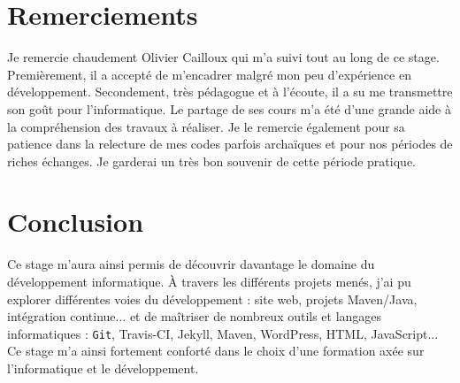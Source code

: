 \chapter*{Remerciements}

Je remercie chaudement Olivier Cailloux qui m’a suivi tout au long de ce stage. Premièrement, il a accepté de m'encadrer malgré mon peu d'expérience en développement. Secondement, très pédagogue et à l’écoute, il a su me transmettre son goût pour l'informatique. Le partage de ses cours m'a été d'une grande aide à la compréhension des travaux à réaliser. Je le remercie également pour sa patience dans la relecture de mes codes parfois archaïques et pour nos périodes de riches échanges. Je garderai un très bon souvenir de cette période pratique.

{\let\clearpage\relax\chapter*{Conclusion
}}

Ce stage m'aura ainsi permis de découvrir davantage le domaine du développement informatique. À travers les différents projets menés, j'ai pu explorer différentes voies du développement : site web, projets Maven/Java, intégration continue... et de maîtriser de nombreux outils et langages informatiques : \texttt{Git}, Travis-CI, Jekyll, Maven, WordPress, HTML, JavaScript... Ce stage m’a ainsi fortement conforté dans le choix d'une formation axée sur l'informatique et le développement.

